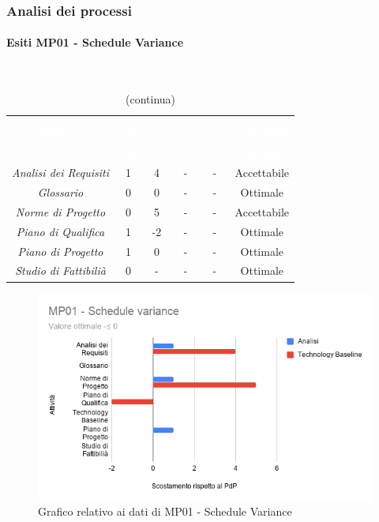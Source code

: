 \subsubsection{Analisi dei processi}
\paragraph{Esiti MP01 - Schedule Variance} \mbox{} \\
\begin{longtable}{c c c c c c}
\rowcolor{white}\caption{Esiti verifica Schedule Variance} \\
		\rowcolor{redafk}
\textcolor{white}{\textbf{Attività}} &
\textcolor{white}{\textbf{An}} &
\textcolor{white}{\textbf{TB}} &
\textcolor{white}{\textbf{PB}} &
\textcolor{white}{\textbf{VC}} &
\textcolor{white}{\textbf{Riscontro}} \\
		\endfirsthead
		\rowcolor{white}\caption[]{(continua)} \\
		\rowcolor{redafk}
\textcolor{white}{\textbf{Attività}} &
\textcolor{white}{\textbf{An}} &
\textcolor{white}{\textbf{TB}} &
\textcolor{white}{\textbf{PB}} &
\textcolor{white}{\textbf{VC}} &
\textcolor{white}{\textbf{Riscontro}} \\
		\endhead
\textit{Analisi dei Requisiti} & 
1 &
4 &
- &
- &
Accettabile \\
\textit{Glossario} & 
0 &
0 &
- &
- &
Ottimale \\
\textit{Norme di Progetto} & 
0 &
5 &
- &
- &
Accettabile \\
\textit{Piano di Qualifica} & 
1 &
-2 &
- &
- &
Ottimale \\
\textit{Piano di Progetto} & 
1 &
0 &
- &
- &
Ottimale \\
\textit{Studio di Fattibilià} & 
0 &
- &
- &
- &
Ottimale \\
\end{longtable}

\begin{figure}[H]
\centering
\includegraphics[scale=0.5]{./img/MP01_schedule_variance.png}
\caption{Grafico relativo ai dati di MP01 - Schedule Variance}
\end{figure}

